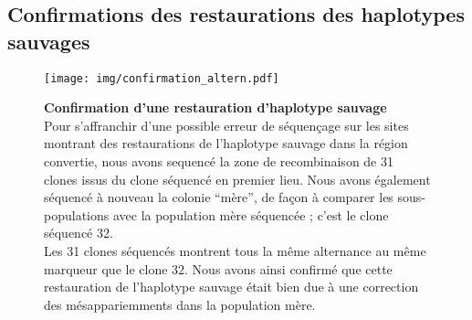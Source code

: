 % 


\subsection{Confirmations des restaurations des haplotypes sauvages}
\label{subsec:confirm-haplotype}

\begin{figure}[ht]
  \centering
  \texttt{[image: img/confirmation\_altern.pdf]}
  \caption[Confirmation des restaurations]{\label{fig:confirm-haplotype}
    \textbf{Confirmation d'une restauration d'haplotype sauvage} \\
    \rmfamily Pour s'affranchir d'une possible erreur de séquençage sur les
    sites montrant des restaurations de l'haplotype sauvage dans la région convertie, nous avons
    sequencé la zone de recombinaison de 31 clones issus du clone séquencé en
    premier lieu. Nous avons également séquencé à nouveau la colonie ``mère'',
    de façon à comparer les sous-populations avec la population mère séquencée ;
    c'est le clone séquencé \num{32}.
    \\
    Les 31 clones séquencés montrent tous la même alternance au même marqueur
    que le clone 32.
    Nous avons ainsi confirmé que cette restauration de l'haplotype sauvage
    était bien due à une correction des mésappariemments dans la population
    mère.
  }
\end{figure}


